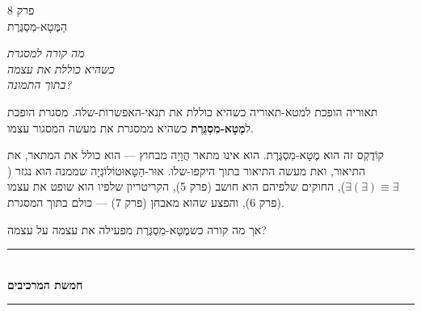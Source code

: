 \documentclass[10pt, openany, oneside]{book}
\renewcommand{\normalsize}{\fontsize{10}{13}\selectfont}
\renewcommand{\large}{\fontsize{11.5}{14}\selectfont}
\renewcommand{\huge}{\fontsize{17}{21}\selectfont}
\begin{document}
%
%
%

\newpage

\begin{center}
    {\huge\textsc{פרק 8}}\\[0.3em]
    {\large\textsc{הַמֶּטָא-מִסְגֶּרֶת}}
\end{center}

\vspace{1.5em}

\begin{center}
    \textit{%
    מה קורה למסגרת\\
    כשהיא כוללת את עצמה\\
    בתוך התמונה?}
\end{center}

\vspace{2em}


\noindent תאוריה הופכת למטא-תאוריה כשהיא כוללת את תנאי-האפשרות-שלה. מסגרת הופכת ל\textbf{מֶטָא-מִסְגֶּרֶת} כשהיא ממסגרת את מעשה המסגור עצמו.

קוֹדֶקְס זה הוא מֶטָא-מִסְגֶּרֶת. הוא אינו מתאר הֲוָיָה מבחוץ — הוא כולל את המתאר, את התיאור, ואת מעשה התיאור בתוך היקפו-שלו. אוּר-הַטָּאוּטוֹלוֹגְיָה שממנה הוא נגזר ($\exists(\exists) \equiv \exists$), החוקים שלפיהם הוא חושב (פרק 5), הקריטריון שלפיו הוא שופט את עצמו (פרק 6), והפצע שהוא מאבחן (פרק 7) — כולם בתוך המסגרת.

אך מה קורה כשמֶטָא-מִסְגֶּרֶת מפעילה את עצמה על עצמה?

\vspace{1.5em}


\begin{center}
    \rule{0.3\textwidth}{0.4pt}\\[0.5em]
    {\normalsize\bfseries\textsc{חמשת המרכיבים}}\\[0.3em]
    \rule{0.3\textwidth}{0.4pt}
\end{center}
\end{document}
